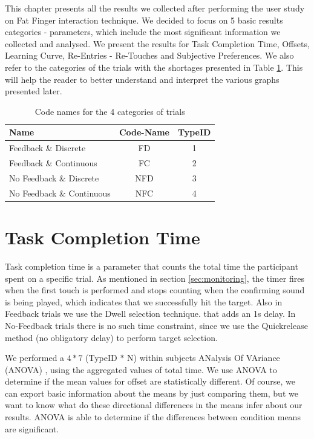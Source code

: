 This chapter presents all the results we collected after performing the user study on Fat Finger interaction technique. We decided to focus on 5 basic results categories - parameters, which include the most significant information we collected and analysed. We present the results for Task Completion Time, Offsets, Learning Curve, Re-Entries - Re-Touches and Subjective Preferences. We also refer to the categories of the trials with the shortages presented in Table \ref{tab:typeIDnames}. This will help the reader to better understand and interpret the various graphs presented later.

\begin{table}[H]
\centering
\begin{tabular}{l || c || c }
Name & Code-Name & TypeID \\
\hline
\hline
Feedback \& Discrete & FD & 1 \\
Feedback \& Continuous & FC & 2 \\
No Feedback \& Discrete & NFD & 3 \\
No Feedback \& Continuous & NFC & 4 \\
\end{tabular}
\caption{Code names for the 4 categories of trials}
\label{tab:typeIDnames}
\end{table}


\section{Task Completion Time}
\label{sec:resultsTaskCompletionTime}

Task completion time is a parameter that counts the total time the participant spent on a specific trial. As mentioned in section \ref{sec:monitoring}, the timer fires when the first touch is performed and stops counting when the confirming sound is being played, which indicates that we successfully hit the target. Also in Feedback trials we use the Dwell selection technique. that adds an 1s delay. In No-Feedback trials there is no such time constraint, since we use the Quickrelease method (no obligatory delay) to perform target selection. 

We performed a $4 * 7$ (TypeID $*$ N) within subjects ANalysis Of VAriance (ANOVA) \cite{anova}, using the aggregated values of total time. We use ANOVA to determine if the mean values for offset are statistically different. Of course, we can export basic information about the means by just comparing them, but we want to know what do these directional differences in the means infer about our results. ANOVA is able to determine if the differences between condition means are significant.

